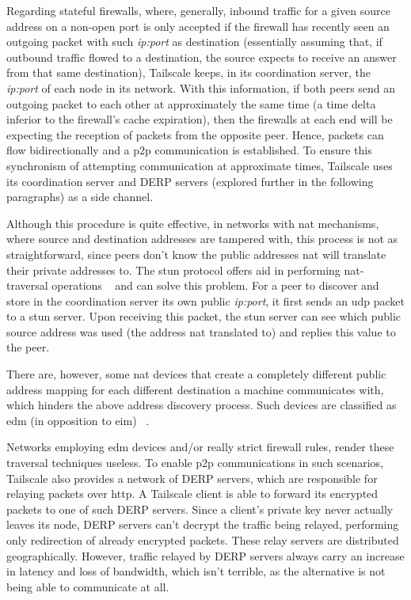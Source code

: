 \documentclass[11pt,twoside,a4paper]{report}
\begin{document}
Regarding stateful firewalls, where, generally, inbound traffic for a given source address on a non-open port is only accepted if the firewall has recently seen an outgoing packet with such \emph{ip:port} as destination (essentially assuming that, if outbound traffic flowed to a destination, the source expects to receive an answer from that same destination), Tailscale keeps, in its coordination server, the \emph{ip:port} of each node in its network. With this information, if both peers send an outgoing packet to each other at approximately the same time (a time delta inferior to the firewall's cache expiration), then the firewalls at each end will be expecting the reception of packets from the opposite peer. Hence, packets can flow bidirectionally and a \ac{p2p} communication is established. To ensure this synchronism of attempting communication at approximate times, Tailscale uses its coordination server and \ac{DERP} servers (explored further in the following paragraphs) as a side channel.

Although this procedure is quite effective, in networks with \ac{nat} mechanisms, where source and destination addresses are tampered with, this process is not as straightforward, since peers don't know the public addresses \ac{nat} will translate their private addresses to. The \ac{stun} protocol offers aid in performing \ac{nat}-traversal operations ~\cite{rfc8489} and can solve this problem. For a peer to discover and store in the coordination server its own public \emph{ip:port}, it first sends an \ac{udp} packet to a \ac{stun} server. Upon receiving this packet, the \ac{stun} server can see which public source address was used (the address \ac{nat} translated to) and replies this value to the peer.

There are, however, some \ac{nat} devices that create a completely different public address mapping for each different destination a machine communicates with, which hinders the above address discovery process. Such devices are classified as \ac{edm} (in opposition to \ac{eim}) ~\cite{rfc4787}.

Networks employing \ac{edm} devices and/or really strict firewall rules, render these traversal techniques useless. To enable \ac{p2p} communications in such scenarios, Tailscale also provides a network of \ac{DERP} servers, which are responsible for relaying packets over \ac{http}. A Tailscale client is able to forward its encrypted packets to one of such \ac{DERP} servers. Since a client's private key never actually leaves its node, \ac{DERP} servers can't decrypt the traffic being relayed, performing only redirection of already encrypted packets. These relay servers are distributed geographically. However, traffic relayed by \ac{DERP} servers always carry an increase in latency and loss of bandwidth, which isn't terrible, as the alternative is not being able to communicate at all.
\end{document}

